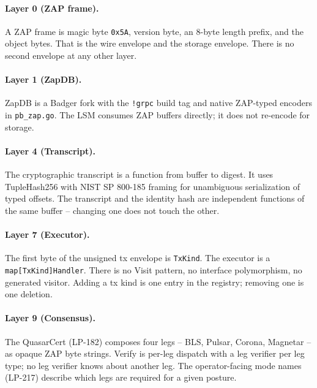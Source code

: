 \paragraph{Layer 0 (ZAP frame).} A ZAP frame is magic byte
\texttt{0x5A}, version byte, an 8-byte length prefix, and the object
bytes. That is the wire envelope and the storage envelope. There is
no second envelope at any other layer.

\paragraph{Layer 1 (ZapDB).} ZapDB is a Badger fork with the
\texttt{!grpc} build tag and native ZAP-typed encoders in
\texttt{pb\_zap.go}. The LSM consumes ZAP buffers directly; it does
not re-encode for storage.

\paragraph{Layer 4 (Transcript).} The cryptographic transcript is a
function from buffer to digest. It uses TupleHash256 with NIST SP
800-185 framing for unambiguous serialization of typed offsets. The
transcript and the identity hash are independent functions of the same
buffer -- changing one does not touch the other.

\paragraph{Layer 7 (Executor).} The first byte of the unsigned tx
envelope is \texttt{TxKind}. The executor is a
\texttt{map[TxKind]Handler}. There is no Visit pattern, no interface
polymorphism, no generated visitor. Adding a tx kind is one entry in
the registry; removing one is one deletion.

\paragraph{Layer 9 (Consensus).} The QuasarCert (LP-182) composes four
legs -- BLS, Pulsar, Corona, Magnetar -- as opaque ZAP byte strings.
Verify is per-leg dispatch with a leg verifier per leg type; no leg
verifier knows about another leg. The operator-facing mode names
(LP-217) describe which legs are required for a given posture.
